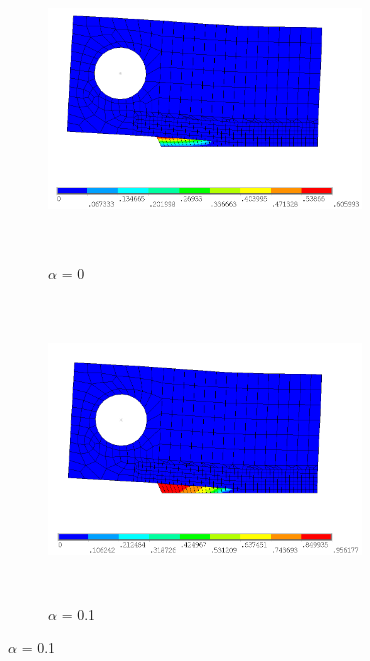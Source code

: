 \documentclass[a4paper,12pt,twoside]{report}
\begin{document}
\begin{figure}[htbp!]
       \captionsetup[subfigure]{justification=centering}
     \begin{subfigure}{0.4\textwidth}
        \centering
         \includegraphics[width=8.3cm,height=8cm,keepaspectratio]{26.d2-1.png}
         \centering
         \caption{$\alpha$ = 0}
         \label{fig:d2-a_0}
     \end{subfigure}
     \hspace{1.8cm}
     \captionsetup[subfigure]{justification=centering}
     \begin{subfigure}{0.4\textwidth}
         \centering
         \includegraphics[width=8.3cm,height=8cm,keepaspectratio]{26.d2_a_0.1.png}
         \centering
         \caption{$\alpha$ = 0.1}
         \label{fig:d2-a_0.1}
     \end{subfigure}
\end{figure}
\FloatBarrier
\end{document}
